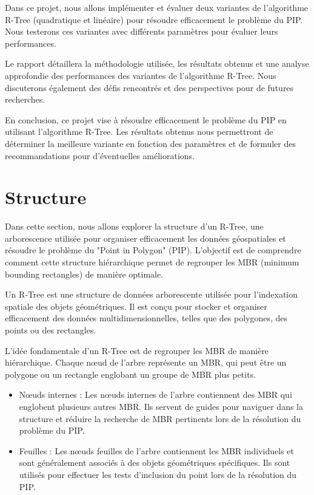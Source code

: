 \documentclass {article}
\begin{document}
Dans ce projet, nous allons implémenter et évaluer deux variantes de l'algorithme R-Tree (quadratique et linéaire) 
pour résoudre efficacement le problème du PIP. Nous testerons ces variantes avec différents paramètres pour 
évaluer leurs performances.

Le rapport détaillera la méthodologie utilisée, les résultats obtenus et une analyse approfondie des performances 
des variantes de l'algorithme R-Tree. Nous discuterons également des défis rencontrés et des perspectives pour de 
futures recherches.


En conclusion, ce projet vise à résoudre efficacement le problème du PIP en utilisant l'algorithme R-Tree. 
Les résultats obtenus nous permettront de déterminer la meilleure variante en fonction des paramètres et 
de formuler des recommandations pour d'éventuelles améliorations.

\section {Structure}

Dans cette section, nous allons explorer la structure d'un R-Tree, une arborescence utilisée pour organiser 
efficacement les données géospatiales et résoudre le problème du "Point in Polygon" (PIP). L'objectif est de 
comprendre comment cette structure hiérarchique permet de regrouper les MBR (minimum bounding rectangles) de 
manière optimale.

Un R-Tree est une structure de données arborescente utilisée pour l'indexation spatiale des objets géométriques. 
Il est conçu pour stocker et organiser efficacement des données multidimensionnelles, telles que des polygones, 
des points ou des rectangles.

L'idée fondamentale d'un R-Tree est de regrouper les MBR de manière hiérarchique. 
Chaque nœud de l'arbre représente un MBR, qui peut être un polygone ou un rectangle englobant un groupe de 
MBR plus petits.
\begin{itemize}

    \item Nœuds internes : Les nœuds internes de l'arbre contiennent des MBR qui englobent plusieurs autres MBR. 
	Ils servent de guides pour naviguer dans la structure et réduire la recherche de MBR pertinents lors de la 
	résolution du problème du PIP.

    \item Feuilles : Les nœuds feuilles de l'arbre contiennent les MBR individuels et sont généralement associés à 
	des objets géométriques spécifiques. Ils sont utilisés pour effectuer les tests d'inclusion du point lors de 
	la résolution du PIP.
\end{itemize}
\end{document}
